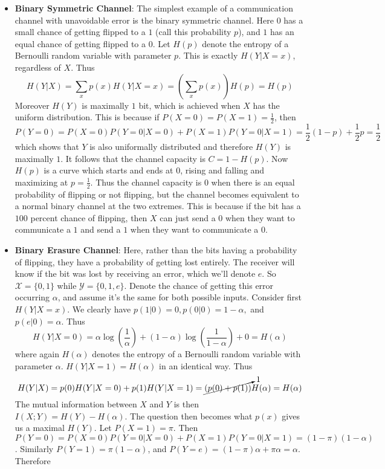 \documentclass{article}
\theoremstyle{definition}
\theoremstyle{plain}
\begin{document}
\begin{itemize}
	\item \textbf{Binary Symmetric Channel}: The simplest example of a communication channel with unavoidable error is the binary symmetric channel. Here $0$ has a small chance of getting flipped to a $1$ (call this probability $p$), and $1$ has an equal chance of getting flipped to a $0$. Let $H(p)$ denote the entropy of a Bernoulli random variable with parameter $p$. This is exactly $H(Y|X = x)$, regardless of $X$. Thus
	\[ H(Y|X) = \sum_x p(x) H(Y|X=x) = \left( \sum_x p(x)\right)H(p) = H(p) \] 
 Moreover $H(Y)$ is maximally $1$ bit, which is achieved when $X$ has the uniform distribution. This is because if $P(X = 0) = P(X = 1) = \frac{1}{2}$, then 
	\[ P(Y=0) = P(X=0)P(Y=0|X=0) + P(X=1)P(Y=0|X=1) = \frac{1}{2}(1-p) + \frac{1}{2}p = \frac{1}{2} \]
	which shows that $Y$ is also uniformally distributed and therefore $H(Y)$ is maximally $1$. It follows that the channel capacity is $C = 1-H(p)$. Now $H(p)$ is a curve which starts and ends at $0$, rising and falling and maximizing at $p=\frac{1}{2}$. Thus the channel capacity is $0$ when there is an equal probability of flipping or not flipping, but the channel becomes equivalent to a normal binary channel at the two extremes. This is because if the bit has a $100$ percent chance of flipping, then $X$ can just send a $0$ when they want to communicate a $1$ and send a $1$ when they want to communicate a $0$. 
	\item \textbf{Binary Erasure Channel}: Here, rather than the bits having a probability of flipping, they have a probability of getting lost entirely. The receiver will know if the bit was lost by receiving an error, which we'll denote $e$. So $\mathcal{X} = \{0,1\}$ while $\mathcal{Y} = \{0,1,e\}$. Denote the chance of getting this error occurring $\alpha$, and assume it's the same for both possible inputs. Consider first $H(Y|X=x)$. We clearly have $p(1|0) = 0, p(0|0)=1-\alpha,$ and $p(e|0) = \alpha$. Thus
	\[ H(Y|X=0) = \alpha\log\left(\frac{1}{\alpha}\right) + (1-\alpha)\log\left(\frac{1}{1-\alpha}\right) + 0 = H(\alpha) \] 
	where again $H(\alpha)$ denotes the entropy of a Bernoulli random variable with parameter $\alpha$. $H(Y|X=1) = H(\alpha)$ in an identical way. Thus
	\[ H(Y|X) = p(0)H(Y|X=0)+p(1)H(Y|X=1) = \cancelto{1}{(p(0)+p(1))}H(\alpha) = H(\alpha) \]
	The mutual information between $X$ and $Y$ is then $I(X;Y) = H(Y) - H(\alpha)$. The question then becomes what $p(x)$ gives us a maximal $H(Y)$. Let $P(X=1) = \pi$. Then $P(Y=0) = P(X=0)P(Y=0|X=0) + P(X=1)P(Y=0|X=1) = (1-\pi)(1-\alpha)$. Similarly $P(Y=1) = \pi(1-\alpha)$, and $P(Y=e) = (1-\pi)\alpha+\pi \alpha = \alpha$. Therefore

\end{itemize}
\end{document}
